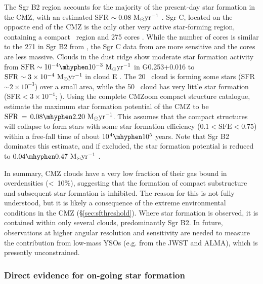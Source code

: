 The Sgr B2 region accounts for the majority of the present-day star formation in the CMZ, with an estimated SFR $\sim 0.08~\mbox{M$_\odot$}\mbox{${\rm yr^{-1}}$}$ \citep{Schmiedeke2016,Ginsburg2018a,Barnes2017}. 
Sgr C, located on the opposite end of the CMZ is the only other very active star-forming region, containing a compact \hii\ region and 275 cores \citep{Kendrew2013,Lu2019b,Lu2020}. While the number of cores is similar to the 271 in Sgr B2 from \citet{Ginsburg2018b}, the Sgr C data from \citet{Lu2020} are more sensitive and the cores are less massive. 
Clouds in the dust ridge show moderate star formation activity from $\mathrm{SFR}\sim10^{-4}\mhyphen10^{-3}~\msun \peryr$ in G0.253+0.016 \citep{Rathborne2014a,Walker2021} to $\mathrm{SFR}\sim3\times10^{-4}~\mbox{M$_\odot$}\mbox{${\rm yr^{-1}}$}$ in cloud E \citep{Lu2019b}.
The 20 \kms\ cloud is forming some stars (SFR $\sim2\times10^{-3}$) over a small area, while the 50 \kms\ cloud has very little star formation (SFR$<3\times10^{-4}$; \citealp{Lu2019b,Uehara2019,Miyawaki2021}).
Using the complete CMZoom compact structure catalogue, \citet{Hatchfield2020} estimate the maximum star formation potential of the CMZ to be $\mathrm{SFR}\,=\,0.08\mhyphen2.20~\msun\peryr$. This assumes that the compact structures will collapse to form stars with some star formation efficiency ($0.1 < \mathrm{SFE} < 0.75$) within a free-fall time of about 10$^4\mhyphen10^5$ years. Note that Sgr B2 dominates this estimate, and if excluded, the star formation potential is reduced to $0.04\mhyphen0.47~\msun\peryr$ \citep{Hatchfield2020}.

In summary, CMZ clouds have a very low fraction of their gas bound in overdensities (\textless \ 10\%), suggesting that the formation of compact substructure and subsequent star formation is inhibited. The reason for this is not fully understood, but it is likely a consequence of the extreme environmental conditions in the CMZ (\S\ref{sec:sfthreshold}). Where star formation is observed, it is contained within only several clouds, predominantly Sgr B2. In future, observations at higher angular resolution and sensitivity are needed to measure the contribution from low-mass YSOs (e.g. from the JWST and ALMA), which is presently unconstrained.

\subsubsection{Direct evidence for on-going star formation} 
\label{sec:ongoingstarformation}

